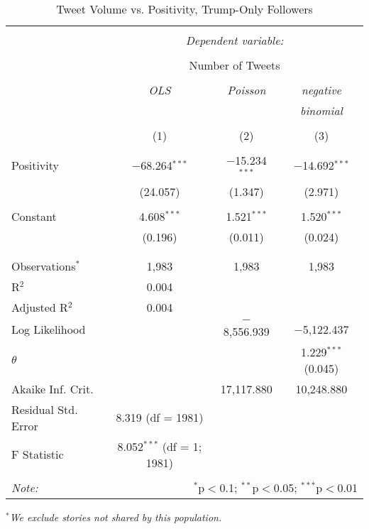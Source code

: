 \begin{table}[!htbp] \centering 
  \caption{Tweet Volume vs. Positivity, Trump-Only Followers} 
  \label{} 
    \begin{tabular}{@{\extracolsep{5pt}}lccc} 
    \\[-1.8ex]\hline 
    \hline \\[-1.8ex] 
     & \multicolumn{3}{c}{\textit{Dependent variable:}} \\ 
    \cline{2-4} 
    \\[-1.8ex] & \multicolumn{3}{c}{Number of Tweets} \\ 
    \\[-1.8ex] & \textit{OLS} & \textit{Poisson} & \textit{negative} \\ 
     & \textit{} & \textit{} & \textit{binomial} \\ 
    \\[-1.8ex] & (1) & (2) & (3)\\ 
    \hline \\[-1.8ex] 
     Positivity & $-$68.264$^{***}$ & $-$15.234$^{***}$ & $-$14.692$^{***}$ \\ 
      & (24.057) & (1.347) & (2.971) \\ 
      & & & \\ 
     Constant & 4.608$^{***}$ & 1.521$^{***}$ & 1.520$^{***}$ \\ 
      & (0.196) & (0.011) & (0.024) \\ 
      & & & \\ 
    \hline \\[-1.8ex] 
    Observations$^{*}$ & 1,983 & 1,983 & 1,983 \\ 
    R$^{2}$ & 0.004 &  &  \\ 
    Adjusted R$^{2}$ & 0.004 &  &  \\ 
    Log Likelihood &  & $-$8,556.939 & $-$5,122.437 \\ 
    $\theta$ &  &  & 1.229$^{***}$  (0.045) \\ 
    Akaike Inf. Crit. &  & 17,117.880 & 10,248.880 \\ 
    Residual Std. Error & 8.319 (df = 1981) &  &  \\ 
    F Statistic & 8.052$^{***}$ (df = 1; 1981) &  &  \\ 
    \hline 
    \hline \\[-1.8ex] 
    \textit{Note:}  & \multicolumn{3}{r}{$^{*}$p$<$0.1; $^{**}$p$<$0.05; $^{***}$p$<$0.01} \\ 
    \end{tabular} 
\end{table} 
\emph{$^{*}$We exclude stories not shared by this population.} 
\newpage 

